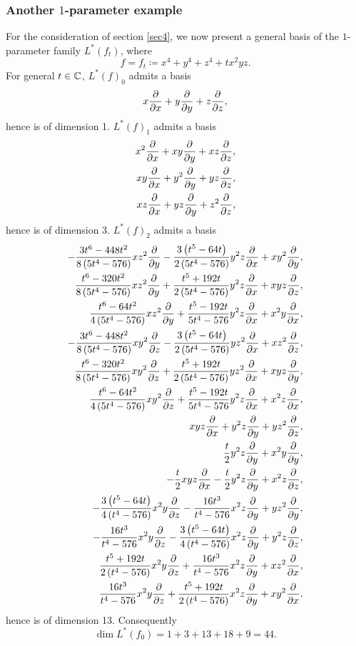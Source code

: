   \subsubsection{Another \texorpdfstring{$1$}{1}-parameter example}
  For the consideration of section \ref{sec4},  we now present a general basis of the $1$-parameter family $L^*(f_t)$, where 
  \[f=f_t\coloneq  x^4+y^4+z^4+tx^2yz.\] 		
  For general $t\in {\mathbb{C}}$, $L^*(f)_0$ admits a basis 
  \[ x \frac{\partial }{\partial x} + y \frac{\partial }{\partial y} + z\frac{\partial }{\partial z},\]
  hence is of dimension 1.
  $L^*(f)_1$ admits a basis 
  \begin{align*}
    x^2 \frac{\partial }{\partial x} + xy \frac{\partial }{\partial y} + xz \frac{\partial }{\partial z} ,\\
    xy\frac{\partial }{\partial x}+ y^2\frac{\partial }{\partial y} + yz \frac{\partial }{\partial z},\\
    xz \frac{\partial }{\partial x} + yz \frac{\partial }{\partial y} + z^2\frac{\partial }{\partial z},
  \end{align*}
  hence is of dimension 3.
  $L^*(f)_2$ admits a basis 
  \begingroup
  \allowdisplaybreaks
  \begin{align*}
    -\frac{3t^6-448t^2}{8\left(5t^4-576\right) } xz^2 \frac{\partial }{\partial y} 
    - \frac{ 3 \left( t^5-64 t\right)}{2\left( 5 t^4 - 576\right)} y^2 z \frac{\partial }{\partial x} 
    + xy^2 \frac{\partial }{\partial y} ,\\
    \frac{t^6-320t^2}{8\left( 5t^4-576\right)} xz^2 \frac{\partial }{\partial y} 
    +\frac{t^5+192t}{2\left(5t^4-576\right)}y^2 z\frac{\partial }{\partial x}
    +xyz\frac{\partial }{\partial z},\\
    \frac{t^6-64t^2}{4\left( 5t^4-576\right)}xz^2\frac{\partial }{\partial y}
    +\frac{t^5-192 t}{5t^4-576}y^2 z \frac{\partial }{\partial x}
    +x^2y\frac{\partial }{\partial x} ,\\
    -\frac{3t^6-448t^2}{8\left(5t^4-576\right) } xy^2 \frac{\partial }{\partial z} 
    - \frac{ 3 \left( t^5-64 t\right)}{2\left( 5 t^4 - 576\right)} y z^2 \frac{\partial }{\partial x} 
    + xz^2 \frac{\partial }{\partial z} ,\\
    \frac{t^6-320t^2}{8\left( 5t^4-576\right)} xy^2 \frac{\partial }{\partial z} 
    +\frac{t^5+192t}{2\left(5t^4-576\right)}y z^2\frac{\partial }{\partial x}
    +xyz\frac{\partial }{\partial y},\\
    \frac{t^6-64t^2}{4\left( 5t^4-576\right)}xy^2\frac{\partial }{\partial z}
    +\frac{t^5-192 t}{5t^4-576}y^2 z \frac{\partial }{\partial x}
    +x^2z\frac{\partial }{\partial x} ,\\
    xyz\frac{\partial }{\partial x}+y^2z\frac{\partial }{\partial y} + y z^2\frac{\partial }{\partial z},\\
    \frac t 2 y ^2 z \frac{\partial }{\partial y}+ x^2 y \frac{\partial }{\partial y}  ,\\
    - \frac t 2 xyz\frac{\partial }{\partial x} - \frac t 2 y^2 z \frac{\partial }{\partial y}+x^2 z \frac{\partial }{\partial z} ,\\
    -\frac{3\left(t^5-64t\right)}{4\left(t^4-576 \right ) }x^2y \frac{\partial }{\partial z}
    -\frac{16 t^3}{t^4-576}x^2z\frac{\partial }{\partial y}
    +yz^2\frac{\partial }{\partial y},\\
    -\frac{16t^3}{t^4-576}x^2y \frac{\partial }{\partial z} 
    -\frac{3\left(t^5-64t\right)}{4\left(t^4-576\right)} x^2 z \frac{\partial }{\partial y}
    +y^2z\frac{\partial }{\partial z},\\
    \frac{t^5+192 t}{2\left( t^4-576\right)}x^2y \frac{\partial }{\partial z} 
    +\frac{16t^3}{t^4-576}x^2z\frac{\partial }{\partial y}
    +xz^2\frac{\partial }{\partial x},\\
    \frac{16t^3}{t^4-576}x^2y\frac{\partial }{\partial z}
    +\frac{t^5+192t}{2\left(t^4-576\right)}x^2z\frac{\partial }{\partial y}
    +xy^2\frac{\partial }{\partial x}.
  \end{align*}
  \endgroup
  hence is of dimension 13. Consequently
  \[\dim L^*(f_0) = 1+3+13+18+9=44.\]

